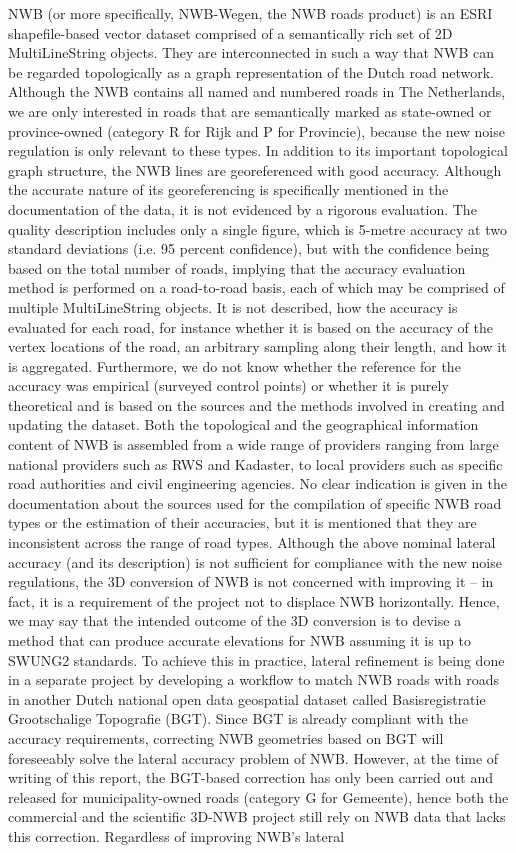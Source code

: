 NWB (or more specifically, NWB-Wegen, the NWB roads product) is an ESRI shapefile-based vector dataset comprised of a semantically rich set of 2D MultiLineString objects. They are interconnected in such a way that NWB can be regarded topologically as a graph representation of the Dutch road network. Although the NWB contains all named and numbered roads in The Netherlands, we are only interested in roads that are semantically marked as state-owned or province-owned (category R for Rijk and P for Provincie), because the new noise regulation is only relevant to these types. In addition to its important topological graph structure, the NWB lines are georeferenced with good accuracy. Although the accurate nature of its georeferencing is specifically mentioned in the documentation of the data, it is not evidenced by a rigorous evaluation. The quality description includes only a single figure, which is 5-metre accuracy at two standard deviations (i.e. 95 percent confidence), but with the confidence being based on the total number of roads, implying that the accuracy evaluation method is performed on a road-to-road basis, each of which may be comprised of multiple MultiLineString objects. It is not described, how the accuracy is evaluated for each road, for instance whether it is based on the accuracy of the vertex locations of the road, an arbitrary sampling along their length, and how it is aggregated. Furthermore, we do not know whether the reference for the accuracy was empirical (surveyed control points) or whether it is purely theoretical and is based on the sources and the methods involved in creating  and updating the dataset. Both the topological and the geographical information content of NWB is assembled from a wide range of providers ranging from large national providers such as RWS and Kadaster, to local providers such as specific road authorities and civil engineering agencies. No clear indication is given in the documentation about the sources used for the compilation of specific NWB road types or the estimation of their accuracies, but it is mentioned that they are inconsistent across the range of road types. Although the above nominal lateral accuracy (and its description) is not sufficient for compliance with the new noise regulations, the 3D conversion of NWB is not concerned with improving it – in fact, it is a requirement of the project not to displace NWB horizontally. Hence, we may say that the intended outcome of the 3D conversion is to devise a method that can produce accurate elevations for NWB assuming it  is up to SWUNG2 standards. To achieve this in practice, lateral refinement is being done in a separate project by developing a workflow to match NWB roads with roads in another Dutch national open data geospatial dataset called Basisregistratie Grootschalige Topografie (BGT). Since BGT is already compliant with the accuracy requirements, correcting NWB geometries based on BGT will foreseeably solve the lateral accuracy problem of NWB. However, at the time of writing of this report, the BGT-based correction has only been carried out and released for municipality-owned roads (category G for Gemeente), hence both the commercial and the scientific 3D-NWB project still rely on NWB data that lacks this correction. Regardless of improving NWB’s lateral 